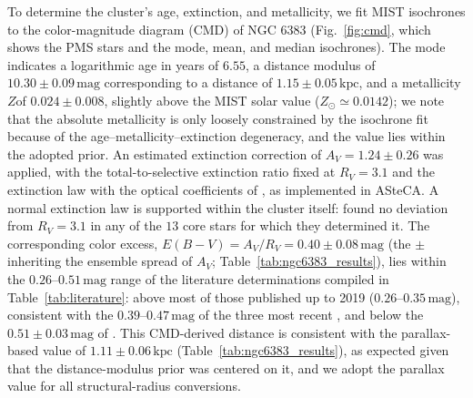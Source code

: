 \documentclass{aa}
\providecommand{\DIFaddtex}[1]{{\protect\color{red}\uwave{#1}}} %
\providecommand{\DIFaddbegin}{} %
\providecommand{\DIFaddend}{} %
\providecommand{\DIFadd}[1]{\texorpdfstring{\DIFaddtex{#1}}{#1}} %
\providecommand{\DIFaddincludegraphics}[2][]{{\color{blue}\fbox{\DIFOincludegraphics[#1]{#2}}}} %
\DeclareRobustCommand{\DIFaddbegin}{\DIFOaddbegin \let\includegraphics\DIFaddincludegraphics} %
\DeclareRobustCommand{\DIFaddend}{\DIFOaddend \let\includegraphics\DIFOincludegraphics} %
\begin{document}
To determine the cluster's age, extinction, and metallicity, we fit MIST isochrones to the color-magnitude diagram (CMD) of NGC 6383 (Fig.~\ref{fig:cmd}, which shows the PMS stars and the mode, mean, and median isochrones). The mode indicates a logarithmic age in years of $6.55$, a distance modulus of $10.30\pm 0.09\,\mathrm{mag}$ corresponding to a distance of $1.15\pm0.05\,\mathrm{kpc}$, and a metallicity\DIFaddbegin \DIFadd{, }\DIFaddend $Z $\DIFaddbegin \DIFadd{, }\DIFaddend of $0.024 \pm 0.008$, slightly above the MIST solar value ($Z_\odot\simeq0.0142$); we note that the absolute metallicity is only loosely constrained by the isochrone fit because of the age--metallicity--extinction degeneracy, and the value lies within the adopted prior. An estimated extinction correction of $A_V = 1.24 \pm 0.26$ was applied, with the total-to-selective extinction ratio fixed at $R_V = 3.1$ and the \citet{1989ApJ...345..245C} extinction law with the optical coefficients of \citet{1994ApJ...422..158O}, as implemented in ASteCA\@. A normal extinction law is supported within the cluster itself: \citet{2000AA...362..580V} found no deviation from $R_V = 3.1$ in any of the $13$ core stars for which they determined it. The corresponding color excess, $E(B-V) = A_V/R_V = 0.40 \pm 0.08\,\mathrm{mag}$ (the $\pm$ inheriting the ensemble spread of $A_V$; Table~\ref{tab:ngc6383_results}), lies within the $0.26$--$0.51\,\mathrm{mag}$ range of the literature determinations compiled in Table~\ref{tab:literature}: above most of those published up to 2019 ($0.26$--$0.35\,\mathrm{mag}$), consistent with the $0.39$--$0.47\,\mathrm{mag}$ of the three most recent \citep{2022ApJS..262....7H,2024arXiv240305143H,2024arXiv240301030P}, and below the $0.51 \pm 0.03\,\mathrm{mag}$ of \citet{2018AA...610A..30A}. This CMD-derived distance is consistent with the parallax-based value of $1.11 \pm 0.06\,\mathrm{kpc}$ (Table~\ref{tab:ngc6383_results}), as expected given that the distance-modulus prior was centered on it, and we adopt\DIFaddbegin \DIFadd{ed}\DIFaddend{}  the parallax value for all structural-radius conversions.
\end{document}
